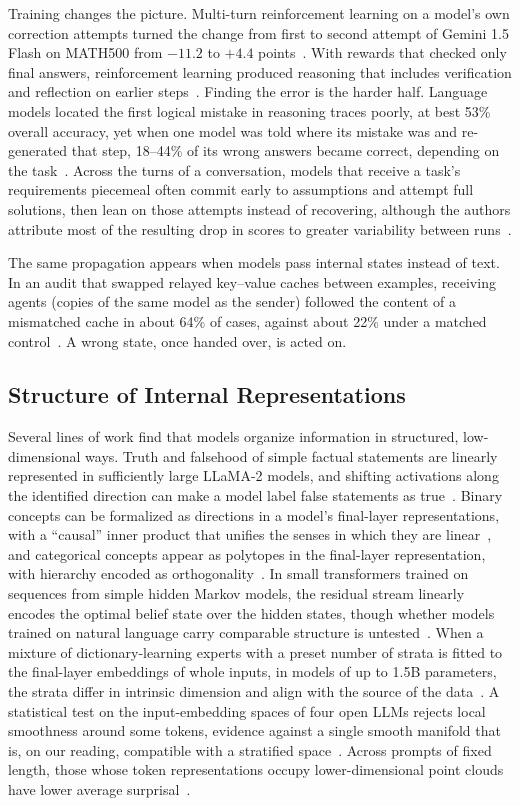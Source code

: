 \documentclass{ieeeaccess}
\begin{document}
Training changes the picture. Multi-turn reinforcement learning on a model's own correction attempts turned the change from first to second attempt of Gemini 1.5 Flash on MATH500 from $-11.2$ to $+4.4$ points~\cite{kumar2025score}. With rewards that checked only final answers, reinforcement learning produced reasoning that includes verification and reflection on earlier steps~\cite{deepseek2025r1}. Finding the error is the harder half. Language models located the first logical mistake in reasoning traces poorly, at best 53\% overall accuracy, yet when one model was told where its mistake was and re-generated that step, 18--44\% of its wrong answers became correct, depending on the task~\cite{tyen2024llms}. Across the turns of a conversation, models that receive a task's requirements piecemeal often commit early to assumptions and attempt full solutions, then lean on those attempts instead of recovering, although the authors attribute most of the resulting drop in scores to greater variability between runs~\cite{laban2025lost}.

The same propagation appears when models pass internal states instead of text. In an audit that swapped relayed key--value caches between examples, receiving agents (copies of the same model as the sender) followed the content of a mismatched cache in about 64\% of cases, against about 22\% under a matched control~\cite{cheng2026audit}. A wrong state, once handed over, is acted on.

\subsection{Structure of Internal Representations}
Several lines of work find that models organize information in structured, low-dimensional ways. Truth and falsehood of simple factual statements are linearly represented in sufficiently large LLaMA-2 models, and shifting activations along the identified direction can make a model label false statements as true~\cite{marks2024geometry}. Binary concepts can be formalized as directions in a model's final-layer representations, with a ``causal'' inner product that unifies the senses in which they are linear~\cite{park2024linear}, and categorical concepts appear as polytopes in the final-layer representation, with hierarchy encoded as orthogonality~\cite{park2025categorical}. In small transformers trained on sequences from simple hidden Markov models, the residual stream linearly encodes the optimal belief state over the hidden states, though whether models trained on natural language carry comparable structure is untested~\cite{shai2024belief}. When a mixture of dictionary-learning experts with a preset number of strata is fitted to the final-layer embeddings of whole inputs, in models of up to 1.5B parameters, the strata differ in intrinsic dimension and align with the source of the data~\cite{li2025unraveling}. A statistical test on the input-embedding spaces of four open LLMs rejects local smoothness around some tokens, evidence against a single smooth manifold that is, on our reading, compatible with a stratified space~\cite{robinson2025token}. Across prompts of fixed length, those whose token representations occupy lower-dimensional point clouds have lower average surprisal~\cite{viswanathan2024geometry}.
\end{document}
